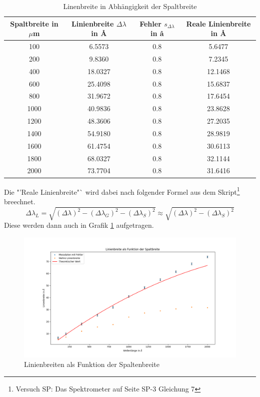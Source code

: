\begin{table}[h]
    \centering
    \begin{tabular}[h]{c|c|c|c}
        Spaltbreite in $\mu$m & Linienbreite $\Delta \lambda $ in \r{A} & Fehler $s_{\Delta \lambda }$ in \r{a}& Reale Linienbreite in \r{A}\\
        \hline
        100 & 6.5573 & 0.8 & 5.6477\\
        200 & 9.8360 & 0.8 & 7.2345\\
        400 & 18.0327 & 0.8 & 12.1468\\
        600 & 25.4098 & 0.8 & 15.6837\\
        800 & 31.9672 & 0.8 & 17.6454\\
        1000 & 40.9836 & 0.8 & 23.8628\\
        1200 & 48.3606 & 0.8 & 27.2035\\
        1400 & 54.9180 & 0.8 & 28.9819\\
        1600 & 61.4754 & 0.8 & 30.6113\\
        1800 & 68.0327 & 0.8 & 32.1144\\
        2000 & 73.7704 & 0.8 & 31.6416\\

    \end{tabular}
    \caption{Linenbreite in Abhängigkeit der Spaltbreite}
\end{table}
Die "'Reale Linienbreite"` wird dabei nach folgender Formel aus dem Skript\footnote{Versuch SP: Das Spektrometer auf Seite SP-3 Gleichung 7} breechnet. 
\begin{equation*}
    \Delta \lambda _L = \sqrt{(\Delta \lambda) ^2-(\Delta \lambda_G) ^2-(\Delta \lambda_S) ^2} \approx \sqrt{(\Delta \lambda) ^2-(\Delta \lambda_S) ^2} 
\end{equation*}
Diese werden dann auch in Grafik \ref{RealLin} aufgetragen.
\begin{figure}[h]
    \centering
    \includegraphics[width = \linewidth]{Bilder/Spaltbreite_Linie.png}
    \caption{Linienbreiten als Funktion der Spaltenbreite}
    \label{RealLin}
\end{figure}

